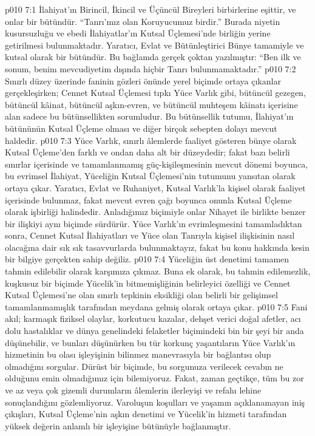 \vs p010 7:1 İlahiyat’ın Birincil, İkincil ve Üçüncül Bireyleri birbirlerine eşittir, ve onlar bir bütündür. “Tanrı’mız olan Koruyucumuz birdir.” Burada niyetin kusursuzluğu ve ebedi İlahiyatlar’ın Kutsal Üçlemesi’nde birliğin yerine getirilmesi bulunmaktadır. Yaratıcı, Evlat ve Bütünleştirici Bünye tamamiyle ve kutsal olarak bir bütündür. Bu bağlamda gerçek çoktan yazılmıştır: “Ben ilk ve sonum, benim mevcudiyetim dışında hiçbir Tanrı bulunmamaktadır.”
\vs p010 7:2 Sınırlı düzey üzerinde faninin gözleri önünde yerel biçimde ortaya çıkanlar gerçekleşirken; Cennet Kutsal Üçlemesi tıpkı Yüce Varlık gibi, bütüncül gezegen, bütüncül kâinat, bütüncül aşkın\hyp{}evren, ve bütüncül muhteşem kâinatı içerisine alan sadece bu bütünsellikten sorumludur. Bu bütünsellik tutumu, İlahiyat’ın bütününün Kutsal Üçleme olması ve diğer birçok sebepten dolayı mevcut haldedir.
\vs p010 7:3 Yüce Varlık, sınırlı âlemlerde faaliyet gösteren bünye olarak Kutsal Üçleme’den farklı ve ondan daha alt bir düzeydedir; fakat bazı belirli sınırlar içerisinde ve tamamlanmamış güç\hyp{}kişileşmesinin mevcut dönemi boyunca, bu evrimsel İlahiyat, Yüceliğin Kutsal Üçlemesi’nin tutumunu yansıtan olarak ortaya çıkar. Yaratıcı, Evlat ve Ruhaniyet, Kutsal Varlık’la kişisel olarak faaliyet içerisinde bulunmaz, fakat mevcut evren çağı boyunca onunla Kutsal Üçleme olarak işbirliği halindedir. Anladığımız biçimiyle onlar Nihayet ile birlikte benzer bir ilişkiyi aynı biçimde sürdürür. Yüce Varlık’ın evrimleşmesini tamamladıktan sonra, Cennet Kutsal İlahiyatları ve Yüce olan Tanrıyla kişisel ilişkisinin nasıl olacağına dair sık sık tasavvurlarda bulunmaktayız, fakat bu konu hakkında kesin bir bilgiye gerçekten sahip değiliz.
\vs p010 7:4 Yüceliğin üst denetimi tamamen tahmin edilebilir olarak karşımıza çıkmaz. Buna ek olarak, bu tahmin edilemezlik, kuşkusuz bir biçimde Yücelik’in bitmemişliğinin belirleyici özelliği ve Cennet Kutsal Üçlemesi’ne olan sınırlı tepkinin eksikliği olan belirli bir gelişimsel tamamlanmamışlık tarafından meydana gelmiş olarak ortaya çıkar.
\vs p010 7:5 Fani akıl; karmaşık fiziksel olaylar, korkutucu kazalar, dehşet verici doğal afetler, acı dolu hastalıklar ve dünya genelindeki felaketler biçimindeki bin bir şeyi bir anda düşünebilir, ve bunları düşünürken bu tür korkunç yaşantıların Yüce Varlık’ın hizmetinin bu olası işleyişinin bilinmez manevrasıyla bir bağlantısı olup olmadığını sorgular. Dürüst bir biçimde, bu sorgunuza verilecek cevabın ne olduğunu emin olmadığımız için bilemiyoruz. Fakat, zaman geçtikçe, tüm bu zor ve az veya çok gizemli durumların âlemlerin ilerleyişi ve refahı lehine sonuçlandığını gözlemliyoruz. Varoluşun koşulları ve yaşamın açıklanamayan iniş çıkışları, Kutsal Üçleme’nin aşkın denetimi ve Yücelik’in hizmeti tarafından yüksek değerin anlamlı bir işleyişine bütünüyle bağlanmıştır.
